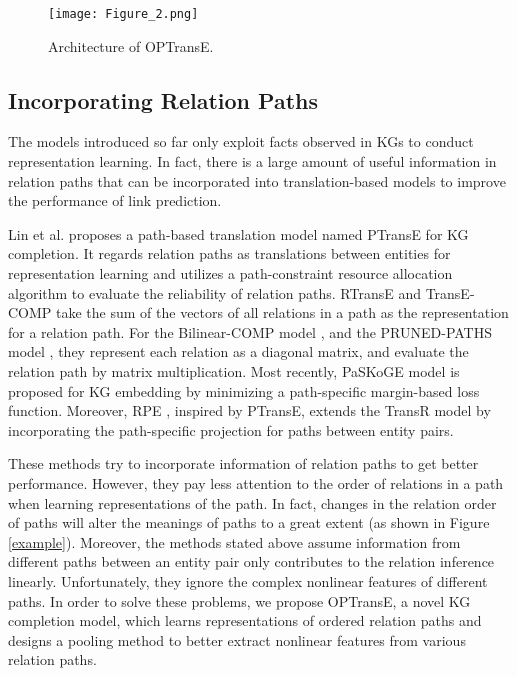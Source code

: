 \documentclass[11pt,a4paper]{article}
\begin{document}
\begin{figure*}[]
    \centering
    \texttt{[image: Figure\_2.png]}
    \caption{Architecture of OPTransE.}
    \label{Architecture}
\end{figure*}


\subsection{Incorporating Relation Paths}

The models introduced so far only exploit facts observed in KGs to
conduct representation learning. In fact, there is a large amount of
useful information in relation paths that can be incorporated into
translation-based models to improve the performance of link
prediction.

Lin et al.  proposes a path-based
translation model named PTransE for KG completion. It regards
relation paths as translations between entities for representation
learning and utilizes a path-constraint resource allocation
algorithm to evaluate the reliability of relation paths. RTransE
\cite{garcia2015composing} and TransE-COMP \cite{guu2015traversing}
take the sum of the vectors of all relations in a path as the
representation for a relation path. For the Bilinear-COMP model
\cite{guu2015traversing}, and the PRUNED-PATHS model
\cite{toutanova2016compositional}, they represent each relation as a
diagonal matrix, and evaluate the relation path by matrix
multiplication. Most recently, PaSKoGE model \cite{jia2018path} is
proposed for KG embedding by minimizing a path-specific margin-based
loss function. Moreover, RPE \cite{lin2018relation}, inspired by
PTransE, extends the TransR model by incorporating the path-specific
projection for paths between entity pairs.

These methods try to incorporate information of relation paths to
get better performance. However, they pay less attention to the
order of relations in a path when learning representations of the
path. In fact, changes in the relation order of paths will alter the
meanings of paths to a great extent (as shown in Figure
\ref{example}). Moreover, the methods stated above assume
information from different paths between an entity pair only contributes to the relation inference linearly. Unfortunately, they ignore the
complex nonlinear features of different paths. In order to solve
these problems, we propose OPTransE, a novel KG completion model,
which learns representations of ordered relation paths and designs a
pooling method to better extract nonlinear features from various
relation paths.
\end{document}
